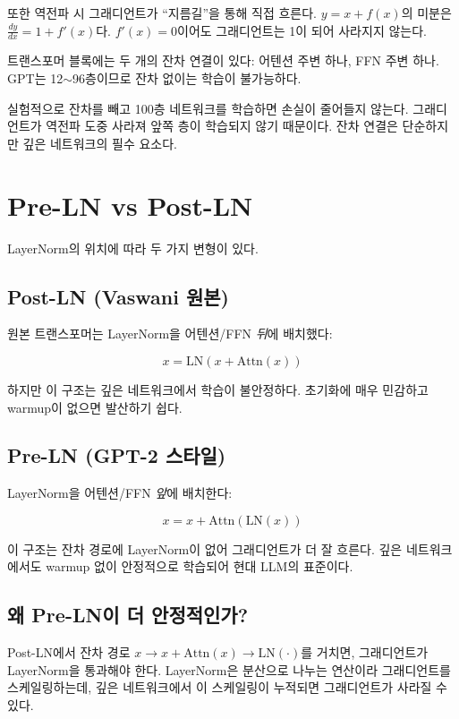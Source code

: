 또한 역전파 시 그래디언트가 ``지름길''을 통해 직접 흐른다. $y = x + f(x)$의 미분은 $\frac{dy}{dx} = 1 + f'(x)$다. $f'(x) = 0$이어도 그래디언트는 1이 되어 사라지지 않는다.

트랜스포머 블록에는 두 개의 잔차 연결이 있다: 어텐션 주변 하나, FFN 주변 하나. GPT는 12$\sim$96층이므로 잔차 없이는 학습이 불가능하다.

\begin{warnbox}[잔차 없는 100층 네트워크]
실험적으로 잔차를 빼고 100층 네트워크를 학습하면 손실이 줄어들지 않는다. 그래디언트가 역전파 도중 사라져 앞쪽 층이 학습되지 않기 때문이다. 잔차 연결은 단순하지만 깊은 네트워크의 필수 요소다.
\end{warnbox}

\section{Pre-LN vs Post-LN}

LayerNorm의 위치에 따라 두 가지 변형이 있다.

\subsection{Post-LN (Vaswani 원본)}

원본 트랜스포머는 LayerNorm을 어텐션/FFN \emph{뒤}에 배치했다:

\[
x = \text{LN}(x + \text{Attn}(x))
\]

하지만 이 구조는 깊은 네트워크에서 학습이 불안정하다. 초기화에 매우 민감하고 warmup이 없으면 발산하기 쉽다.

\subsection{Pre-LN (GPT-2 스타일)}

LayerNorm을 어텐션/FFN \emph{앞}에 배치한다:

\[
x = x + \text{Attn}(\text{LN}(x))
\]

이 구조는 잔차 경로에 LayerNorm이 없어 그래디언트가 더 잘 흐른다. 깊은 네트워크에서도 warmup 없이 안정적으로 학습되어 현대 LLM의 표준이다.

\subsection{왜 Pre-LN이 더 안정적인가?}

Post-LN에서 잔차 경로 $x \to x + \text{Attn}(x) \to \text{LN}(\cdot)$를 거치면, 그래디언트가 LayerNorm을 통과해야 한다. LayerNorm은 분산으로 나누는 연산이라 그래디언트를 스케일링하는데, 깊은 네트워크에서 이 스케일링이 누적되면 그래디언트가 사라질 수 있다.

